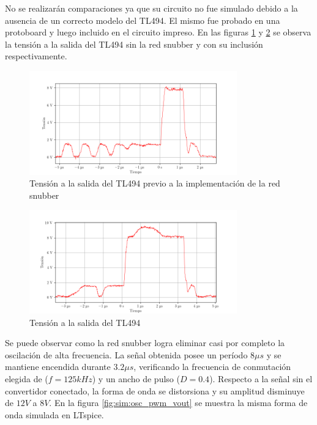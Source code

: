 No se realizarán comparaciones ya que su circuito no fue simulado debido a la ausencia de un correcto modelo del TL494.
El mismo fue probado en una protoboard y luego incluido en el circuito impreso.
En las figuras \ref{fig:osc_pwm_vout_no_snubber} y \ref{fig:osc_pwm_vout_disconnected} se observa la tensión a la salida del TL494 sin la red snubber y con su inclusión respectivamente.
\begin{figure}[H]
    \centering
    \includegraphics[width=0.8\textwidth]{images/capturas-osciloscopio/TL494/pwm_vout_connected.png}
    \caption{Tensión a la salida del TL494 previo a la implementación de la red snubber}
    \label{fig:osc_pwm_vout_no_snubber}
\end{figure}

\begin{figure}[H]
    \centering
    \includegraphics[width=0.8\textwidth]{images/capturas-osciloscopio/17-11-2022/1.png}
    \caption{Tensión a la salida del TL494}
    \label{fig:osc_pwm_vout_disconnected}
\end{figure}

Se puede observar como la red snubber logra eliminar casi por completo la oscilación de alta frecuencia. 
La señal obtenida posee un período $8\mu s$ y se mantiene encendida durante $3.2\mu s$, verificando la frecuencia de conmutación elegida de ($f=125kHz$) y un ancho de pulso ($D=0.4$).
Respecto a la señal sin el convertidor conectado, la forma de onda se distorsiona y su amplitud disminuye de $12V$ a $8V$.
En la figura \ref{fig:sim:osc_pwm_vout} se muestra la misma forma de onda simulada en LTspice.

